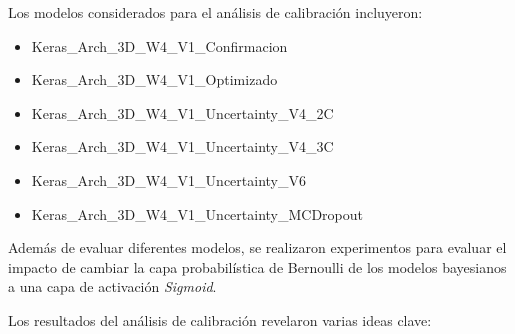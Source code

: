 \documentclass[10pt, oneside, a4paper]{article}
\begin{document}
	Los modelos considerados para el análisis de calibración incluyeron:

	\begin{itemize}
		\item Keras\_Arch\_3D\_W4\_V1\_Confirmacion 
		\item Keras\_Arch\_3D\_W4\_V1\_Optimizado
		\item Keras\_Arch\_3D\_W4\_V1\_Uncertainty\_V4\_2C
		\item Keras\_Arch\_3D\_W4\_V1\_Uncertainty\_V4\_3C
		\item Keras\_Arch\_3D\_W4\_V1\_Uncertainty\_V6
		\item Keras\_Arch\_3D\_W4\_V1\_Uncertainty\_MCDropout
	\end{itemize}	
	

	Además de evaluar diferentes modelos, se realizaron experimentos para evaluar el impacto de cambiar la capa probabilística de Bernoulli de los modelos bayesianos a una capa de activación \textsl{Sigmoid}.
	
	Los resultados del análisis de calibración revelaron varias ideas clave:
	
\end{document}
